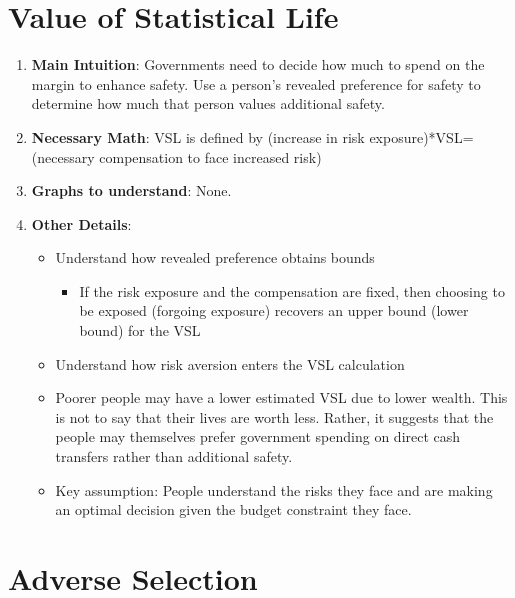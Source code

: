 \documentclass[letter,12pt]{article}
\begin{document}
\section{Value of Statistical Life}
\begin{enumerate}
	\item \textbf{Main Intuition}: Governments need to decide how much to spend on the margin to enhance safety. Use a person's revealed preference for safety to determine how much that person values additional safety.
	\item \textbf{Necessary Math}: VSL is defined by (increase in risk exposure)*VSL=(necessary compensation to face increased risk)
	\item \textbf{Graphs to understand}: None.
	\item \textbf{Other Details}:
	\begin{itemize}
		\item Understand how revealed preference obtains bounds
		\begin{itemize}
			\item If the risk exposure and the compensation are fixed, then choosing to be exposed (forgoing exposure) recovers an upper bound (lower bound) for the VSL
		\end{itemize}
		\item Understand how risk aversion enters the VSL calculation
		\item Poorer people may have a lower estimated VSL due to lower wealth. This is not to say that their lives are worth less. Rather, it suggests that the people may themselves prefer government spending on direct cash transfers rather than additional safety.
		\item Key assumption: People understand the risks they face and are making an optimal decision given the budget constraint they face.
	\end{itemize} 
\end{enumerate}


\section{Adverse Selection}
\end{document}
